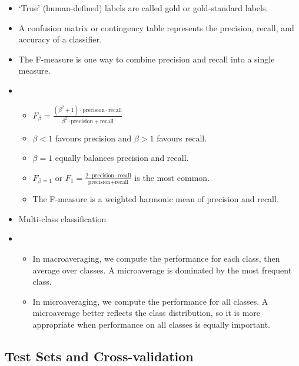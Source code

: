 \begin{itemize}
      \item `True' (human-defined) labels are called gold or gold-standard labels.
      \item A confusion matrix or contingency table represents the precision, recall, and accuracy of a classifier.
      \item The F-measure is one way to combine precision and recall into a single measure.
      \item[] \begin{itemize}
                  \item $F_{\beta} = \frac{(\beta^2 + 1) \cdot \text{precision} \cdot \text{recall}}{\beta^2 \cdot \text{precision} + \text{recall}}$
                  \item $\beta < 1$ favours precision and $\beta > 1$ favours recall.
                  \item $\beta = 1$ equally balances precision and recall.
                  \item $F_{\beta = 1}$ or $F_1 = \frac{2 \cdot \text{precision} \cdot \text{recall}}{\text{precision} + \text{recall}}$ is the most common.
                  \item The F-measure is a weighted harmonic mean of precision and recall.
            \end{itemize}
      \item Multi-class classification
      \item[] \begin{itemize}
                  \item In macroaveraging, we compute the performance for each class, then average over classes.
                        A microaverage is dominated by the most frequent class.
                  \item In microaveraging, we compute the performance for all classes.
                        A microaverage better reflects the class distribution, so it is more appropriate when performance on all classes is equally important.
            \end{itemize}
\end{itemize}

\subsection{Test Sets and Cross-validation}

